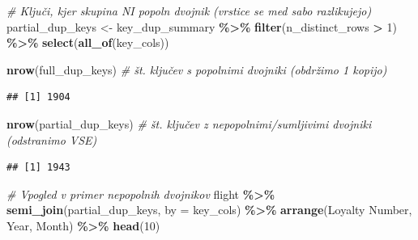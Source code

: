 \documentclass[
]{article}
\newenvironment{Shaded}{\begin{snugshade}}{\end{snugshade}}
\newcommand{\AttributeTok}[1]{\textcolor[rgb]{0.13,0.29,0.53}{#1}}
\newcommand{\CommentTok}[1]{\textcolor[rgb]{0.56,0.35,0.01}{\textit{#1}}}
\newcommand{\DecValTok}[1]{\textcolor[rgb]{0.00,0.00,0.81}{#1}}
\newcommand{\FunctionTok}[1]{\textcolor[rgb]{0.13,0.29,0.53}{\textbf{#1}}}
\newcommand{\NormalTok}[1]{#1}
\newcommand{\OtherTok}[1]{\textcolor[rgb]{0.56,0.35,0.01}{#1}}
\newcommand{\SpecialCharTok}[1]{\textcolor[rgb]{0.81,0.36,0.00}{\textbf{#1}}}
\newcommand{\StringTok}[1]{\textcolor[rgb]{0.31,0.60,0.02}{#1}}
\begin{document}
\begin{Shaded}
\begin{Highlighting}[]
\CommentTok{\# Ključi, kjer skupina NI popoln dvojnik (vrstice se med sabo razlikujejo)}
\NormalTok{partial\_dup\_keys }\OtherTok{\textless{}{-}}\NormalTok{ key\_dup\_summary }\SpecialCharTok{\%\textgreater{}\%}
  \FunctionTok{filter}\NormalTok{(n\_distinct\_rows }\SpecialCharTok{\textgreater{}} \DecValTok{1}\NormalTok{) }\SpecialCharTok{\%\textgreater{}\%}
  \FunctionTok{select}\NormalTok{(}\FunctionTok{all\_of}\NormalTok{(key\_cols))}

\FunctionTok{nrow}\NormalTok{(full\_dup\_keys)      }\CommentTok{\# št. ključev s popolnimi dvojniki (obdržimo 1 kopijo)}
\end{Highlighting}
\end{Shaded}

\begin{verbatim}
## [1] 1904
\end{verbatim}

\begin{Shaded}
\begin{Highlighting}[]
\FunctionTok{nrow}\NormalTok{(partial\_dup\_keys)   }\CommentTok{\# št. ključev z nepopolnimi/sumljivimi dvojniki (odstranimo VSE)}
\end{Highlighting}
\end{Shaded}

\begin{verbatim}
## [1] 1943
\end{verbatim}

\begin{Shaded}
\begin{Highlighting}[]
\CommentTok{\# Vpogled v primer nepopolnih dvojnikov}
\NormalTok{flight }\SpecialCharTok{\%\textgreater{}\%}
  \FunctionTok{semi\_join}\NormalTok{(partial\_dup\_keys, }\AttributeTok{by =}\NormalTok{ key\_cols) }\SpecialCharTok{\%\textgreater{}\%}
  \FunctionTok{arrange}\NormalTok{(}\StringTok{\textasciigrave{}}\AttributeTok{Loyalty Number}\StringTok{\textasciigrave{}}\NormalTok{, Year, Month) }\SpecialCharTok{\%\textgreater{}\%}
  \FunctionTok{head}\NormalTok{(}\DecValTok{10}\NormalTok{)}
\end{Highlighting}
\end{Shaded}
\end{document}
